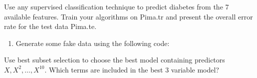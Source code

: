 \documentclass[]{article}
\newenvironment{Shaded}{\begin{snugshade}}{\end{snugshade}}
\newcommand{\CommentTok}[1]{\textcolor[rgb]{0.56,0.35,0.01}{\textit{#1}}}
\newcommand{\DataTypeTok}[1]{\textcolor[rgb]{0.13,0.29,0.53}{#1}}
\newcommand{\DecValTok}[1]{\textcolor[rgb]{0.00,0.00,0.81}{#1}}
\newcommand{\FloatTok}[1]{\textcolor[rgb]{0.00,0.00,0.81}{#1}}
\newcommand{\KeywordTok}[1]{\textcolor[rgb]{0.13,0.29,0.53}{\textbf{#1}}}
\newcommand{\NormalTok}[1]{#1}
\newcommand{\OperatorTok}[1]{\textcolor[rgb]{0.81,0.36,0.00}{\textbf{#1}}}
\newcommand{\StringTok}[1]{\textcolor[rgb]{0.31,0.60,0.02}{#1}}
\providecommand{\tightlist}{%
  \setlength{\itemsep}{0pt}\setlength{\parskip}{0pt}}
\begin{document}
Use any supervised classification technique to predict diabetes from the
7 available features. Train your algorithms on Pima.tr and present the
overall error rate for the test data Pima.te.

\begin{enumerate}
\def\labelenumi{\arabic{enumi}.}
\setcounter{enumi}{5}
\tightlist
\item
  Generate some fake data using the following code:
\end{enumerate}

\begin{Shaded}
\end{Shaded}

Use best subset selection to choose the best model containing predictors
\(X, X^2, \dots, X^{10}\). Which terms are included in the best 3
variable model?

\begin{Shaded}
\end{Shaded}
\end{document}
